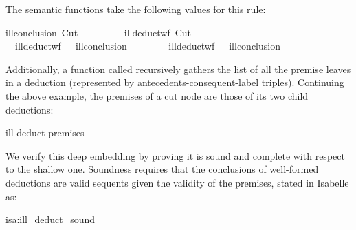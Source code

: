 \documentclass[class=smolathesis,crop=false]{standalone}
\begin{document}
The semantic functions take the following values for this rule\footnotemark:
\begin{isabelle}
  {\isachardoublequoteopen}ill{\isacharunderscore}conclusion\ {\isacharparenleft}Cut\ \ {\isacharequal}\ \ {\isacharat}\ \ {\isacharat}\ \ \isasymturnstile\ \isanewline
  {\isachardoublequoteopen}ill{\isacharunderscore}deduct{\isacharunderscore}wf\ {\isacharparenleft}Cut\ \ {\isacharequal}\isanewline
  \ \ {\isacharparenleft}ill{\isacharunderscore}deduct{\isacharunderscore}wf\ \ {\isasymand}\ ill{\isacharunderscore}conclusion\ \ {\isacharequal}\ \ \isasymturnstile\ \ {\isasymand}\isanewline
  \ \ \isaindent{\isacharparenleft}ill{\isacharunderscore}deduct{\isacharunderscore}wf\ \ {\isasymand}\ ill{\isacharunderscore}conclusion\ \ {\isacharequal}\ \ {\isacharat}\ {\isacharbrackleft}\ {\isacharat}\ \ \isasymturnstile\ 
\end{isabelle}

Additionally, a function called  recursively gathers the list of all the premise leaves in a deduction (represented by antecedents-consequent-label triples).
Continuing the above example, the premises of a cut node are those of its two child deductions:
\begin{isabelle}
  ill-deduct-premises\ \ \isacharequal\isanewline
  \ \ 
\end{isabelle}

We verify this deep embedding by proving it is sound and complete with respect to the shallow one.
Soundness requires that the conclusions of well-formed deductions are valid sequents given the validity of the premises, stated in Isabelle as:
\begin{isalemma}{isa:ill_deduct_sound}
  
\end{isalemma}
\end{document}
